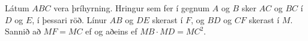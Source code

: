 Látum $ABC$ vera þríhyrning. Hringur sem fer í gegnum $A$ og $B$ sker $AC$ og $BC$ í $D$ og $E$, í þessari röð. Línur $AB$ og $DE$ skerast í $F$, og $BD$ og $CF$ skerast í $M$. Sannið að $MF=MC$ ef og aðeins ef $MB\cdot MD =MC^2$.